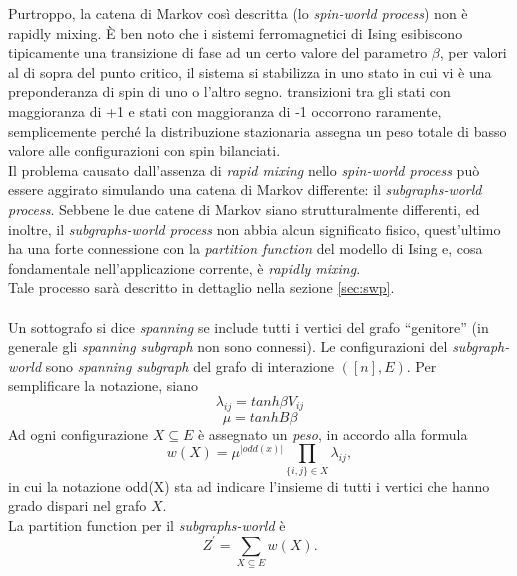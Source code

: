 Purtroppo, la catena di Markov così descritta (lo \textit{spin-world process}) non è rapidly mixing. È ben noto che i sistemi ferromagnetici di Ising esibiscono tipicamente una transizione di fase ad un certo valore del parametro $\beta$, per valori al di sopra del punto critico, il sistema si stabilizza in uno stato in cui vi è una preponderanza di spin di uno o l'altro segno. transizioni tra gli stati con maggioranza di +1 e stati con maggioranza di -1 occorrono raramente, semplicemente perché la distribuzione stazionaria assegna un peso totale di basso valore alle configurazioni con spin bilanciati.\\
Il problema causato dall'assenza di \textit{rapid mixing} nello \textit{spin-world process} può essere aggirato simulando una catena di Markov differente: il \textit{subgraphs-world process}. Sebbene le due catene di Markov siano strutturalmente differenti, ed inoltre, il \textit{subgraphs-world process} non abbia alcun significato fisico, quest'ultimo ha una forte connessione con la \textit{partition function} del modello di Ising e, cosa fondamentale nell'applicazione corrente, è \textit{rapidly mixing}.\\
Tale processo sarà descritto in dettaglio nella sezione \ref{sec:swp}.\\\\
Un sottografo si dice \textit{spanning} se include tutti i vertici del grafo ``genitore'' (in generale gli \textit{spanning subgraph} non sono connessi). Le configurazioni del \textit{subgraph-world} sono \textit{spanning subgraph} del grafo di interazione $([n], E)$. Per semplificare la notazione, siano
\begin{equation}
	\lambda_{ij} = tanh \beta V_{ij}
	\label{lamij}
\end{equation}
\begin{equation}
	\mu = tanh B \beta
	\label{mu}
\end{equation}
Ad ogni configurazione $X \subseteq E$ è assegnato un \textit{peso}, in accordo alla formula
\begin{equation}
	w(X) = \mu^{|odd(x)|}\prod_{\{i,j\} \in X}{\lambda_{ij}},
\end{equation}
in cui la notazione odd(X) sta ad indicare l'insieme di tutti i vertici che hanno grado dispari nel grafo $X$.\\
La partition function per il \textit{subgraphs-world} è
\begin{equation}
	Z^\prime = \sum_{X \subseteq E}{w(X)}.
	\label{zprime}
\end{equation}

